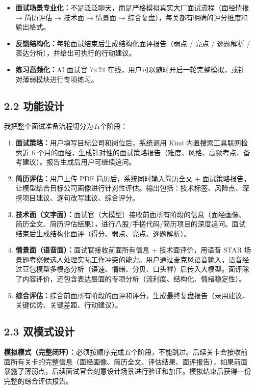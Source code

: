 \documentclass[11pt]{article}
\begin{document}
\begin{itemize}
    \item \textbf{面试场景专业化：}不是泛泛聊天，而是严格模拟真实大厂面试流程（面经情报 → 简历评估 → 技术面 → 情景面 → 综合复盘），每关都有明确的评分维度和输出格式。
    \item \textbf{反馈结构化：}每轮面试结束后生成结构化面评报告（弱点 / 亮点 / 逐题解析 / 表达分析），并给出可执行的行动建议。
    \item \textbf{练习高频化：}AI 面试官 7×24 在线，用户可以随时开启一轮完整模拟，或针对薄弱模块进行专项练习。
\end{itemize}

\subsection*{2.2 功能设计}

我把整个面试准备流程切分为五个阶段：

\begin{enumerate}
    \item \textbf{面试策略：}用户填写目标公司和岗位后，系统调用 Kimi 内置搜索工具联网检索近 6 个月的面经，生成针对性的面试策略报告（难度、风格、高频考点、备考建议）。报告生成后用户可继续追问。
    \item \textbf{简历评估：}用户上传 PDF 简历后，系统同时输入简历全文 + 面试策略报告，让模型结合目标公司画像进行针对性评估。输出包括：技术标签、风险点、深挖项目建议、逐句改写建议、综合评分。
    \item \textbf{技术面（文字面）：}面试官（大模型）接收前面所有阶段的信息（面经画像、简历全文、简历评估结果），进行八股/手搓代码/简历项目的深度追问。面试结束后生成结构化面评（得分、弱点、亮点、逐题解析）。
    \item \textbf{情景面（语音面）：}面试官接收前面所有信息 + 技术面评价，用语音 STAR 场景题考察候选人处理实际工作冲突的能力。用户通过麦克风语音输入，语音经过豆包模型多模态分析（语速、情绪、分贝、口头禅）后传入大模型。面评除了内容评价，还包含表达层面的专项分析（流利度、结构化、情绪稳定性）。
    \item \textbf{综合评估：}综合前面所有阶段的面评和评分，生成最终复盘报告（录用建议、关键优势、关键差距、行动建议）。
\end{enumerate}

\subsection*{2.3 双模式设计}

\textbf{模拟模式（完整闭环）：}必须按顺序完成五个阶段，不能跳过。后续关卡会接收前面所有关卡的完整信息（面经画像、简历全文、评估结果、面评报告），如果前面暴露了薄弱点，后续面试官会刻意设计场景进行验证和加压。模拟结束后获得一份完整的综合评估报告。
\end{document}
